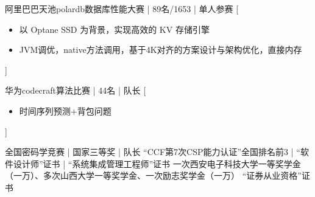 \documentclass[zh]{resume}
\begin{document}
\begin{entries}
    {阿里巴巴天池polardb数据库性能大赛 | 89名/1653 | 单人参赛}%
    [\begin{itemize}
      \item{\icon{\faFlag}} 以 Optane SSD 为背景，实现高效的 KV 存储引擎
      \item{\icon{\faFlag}} JVM调优，native方法调用，基于4K对齐的方案设计与架构优化，直接内存
    \end{itemize}]%

    {华为codecraft算法比赛 | 44名 | 队长}%
    [\begin{itemize}
      \item{\icon{\faFlag}} 时间序列预测+背包问题\quad {}
    \end{itemize}]%

    {全国密码学竞赛 | 国家三等奖 | 队长 \quad {}}%
    {“CCF第7次CSP能力认证”全国排名前3 | “软件设计师”证书 | “系统集成管理工程师”证书}
    {一次西安电子科技大学一等奖学金（一万）、多次山西大学一等奖学金、一次励志奖学金（一万）}
    {“证券从业资格”证书}
\end{entries}
\end{document}
